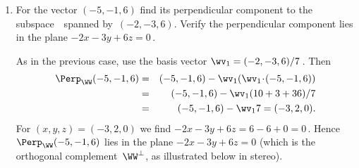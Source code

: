 \begin{example}
\begin{enumerate}
\item\label{eg:perpn:b} For the vector \((-5,-1,6)\) find its perpendicular component to the subspace~\WW\ spanned by~\((-2,-3,6)\).
Verify the perpendicular component lies in the plane \(-2x-3y+6z=0\)\,.
\begin{solution} 
As in the previous case, use the basis vector \(\wv_1=(-2,-3,6)/7\)\,.
Then
\begin{eqnarray*}
\Perp_\WW(-5,-1,6)&=&(-5,-1,6)-\wv_1(\wv_1\cdot(-5,-1,6))
\\&=&(-5,-1,6)-\wv_1(10+3+36)/7
\\&=&(-5,-1,6)-\wv_17=(-3,2,0).
\end{eqnarray*}
For \((x,y,z)=(-3,2,0)\) we find \(-2x-3y+6z=6-6+0=0\)\,.
Hence \(\Perp_\WW(-5,-1,6)\) lies in the plane \(-2x-3y+6z=0\) (which is the orthogonal complement~\(\WW^\perp\), as illustrated below in stereo).
\begin{center}
\end{center}
\end{solution}


\end{enumerate}
\end{example}
